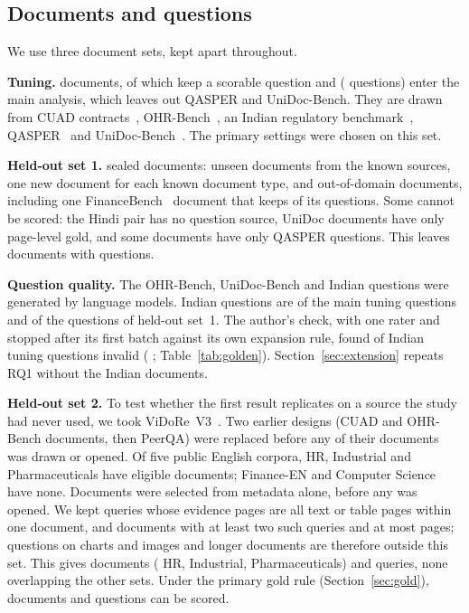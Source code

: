 \subsection{Documents and questions}\label{sec:docs}

We use three document sets, kept apart throughout.

\textbf{Tuning.} \TuningDocuments{} documents, of which \TuningScoredDocuments{} keep a scorable
question and \TuningMainDocuments{} (\TuningMainQuestions{} questions) enter the main analysis, which leaves out
QASPER and UniDoc-Bench. They are drawn from CUAD contracts~\cite{hendrycks2021cuad}, OHR-Bench~\cite{zhang2024ocr}, an Indian
regulatory benchmark~\cite{singh2026parser}, QASPER~\cite{dasigi2021qasper} and
UniDoc-Bench~\cite{peng2025unidoc}. The primary settings were chosen on this set.

\textbf{Held-out set 1.} \AccountingHeldOut{} sealed documents: unseen documents from the known
sources, one new document for each known document type, and out-of-domain
documents, including one FinanceBench~\cite{islam2023financebench} document that
keeps \FinanceBenchKept{} of its \FinanceBenchQuestions{} questions. Some cannot be scored:
the Hindi pair has no question source, UniDoc documents have only page-level
gold, and some documents have only QASPER questions. This leaves \AccountingMain{} documents
with \RQoneQuestions{} questions.

\textbf{Question quality.} The OHR-Bench, UniDoc-Bench and Indian questions were
generated by language models. Indian questions are \IndianTuningQuestions{} of
the \TuningMainQuestions{} main tuning questions and \IndianHeldOutQuestions{} of
the \RQoneQuestions{} questions of held-out set~1. The author's check, with one rater and stopped after its first batch against its own expansion rule, found
\GoldenOverallInvalid{} of \GoldenOverallLabelled{} Indian tuning questions
invalid (\GoldenOverallRate{} \GoldenOverallRateCI{}; Table~\ref{tab:golden}).
Section~\ref{sec:extension} repeats RQ1 without the Indian documents.

\textbf{Held-out set 2.} To test whether the first result replicates on a
source the study had never used, we took ViDoRe~V3~\cite{loison2026vidore}. Two
earlier designs (CUAD and OHR-Bench documents, then PeerQA) were replaced before
any of their documents was drawn or opened. Of five public English corpora,
HR, Industrial and Pharmaceuticals have eligible documents; Finance-EN and
Computer Science have none. Documents were selected
from metadata alone, before any was opened. We kept queries whose evidence
pages are all text or table pages within one document, and documents with at
least two such queries and at most \HTwoMaxPages{} pages;
 questions on charts and images and
longer documents are therefore outside this set. This gives \HTwoSelectedDocuments{} documents %
(\HTwoSelectedHr{} HR, \HTwoSelectedIndustrial{} Industrial, \HTwoSelectedPharmaceuticals{} Pharmaceuticals) and \HTwoQueries{} queries, none overlapping
the other sets. Under the primary gold rule (Section~\ref{sec:gold}),
\RQoneHTwoDropRuleDocuments{} documents and \RQoneHTwoDropRuleQuestions{} questions can be scored.

